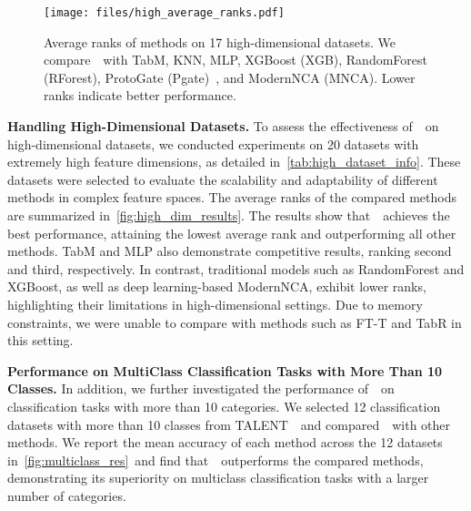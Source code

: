 \begin{figure}
    \centering
    \texttt{[image: files/high\_average\_ranks.pdf]}
    \vspace{-5mm}
    \caption{Average ranks of methods on 17 high-dimensional datasets. We compare~\name~with TabM, KNN, MLP, XGBoost (XGB), RandomForest (RForest), ProtoGate (Pgate)~\cite{Jiang2024ProtoGate}, and ModernNCA (MNCA). Lower ranks indicate better performance.}
    \vspace{-5mm}
    \label{fig:high_dim_results}
\end{figure}
\textbf{Handling High-Dimensional Datasets.}  
To assess the effectiveness of~\name~on high-dimensional datasets, we conducted experiments on 20 datasets with extremely high feature dimensions, as detailed in~\autoref{tab:high_dataset_info}. These datasets were selected to evaluate the scalability and adaptability of different methods in complex feature spaces. The average ranks of the compared methods are summarized in~\autoref{fig:high_dim_results}.
The results show that~\name~achieves the best performance, attaining the lowest average rank and outperforming all other methods. TabM and MLP also demonstrate competitive results, ranking second and third, respectively. In contrast, traditional models such as RandomForest and XGBoost, as well as deep learning-based ModernNCA, exhibit lower ranks, highlighting their limitations in high-dimensional settings. Due to memory constraints, we were unable to compare with methods such as FT-T and TabR in this setting.

\textbf{Performance on MultiClass Classification Tasks with More Than 10 Classes.} In addition, we further investigated the performance of~\name~on classification tasks with more than 10 categories. We selected 12 classification datasets with more than 10 classes from TALENT~\cite{YeACloser}~and compared~\name~with other methods. We report the mean accuracy of each method across the 12 datasets in~\autoref{fig:multiclass_res}~and find that~\name~outperforms the compared methods, demonstrating its superiority on multiclass classification tasks with a larger number of categories.




